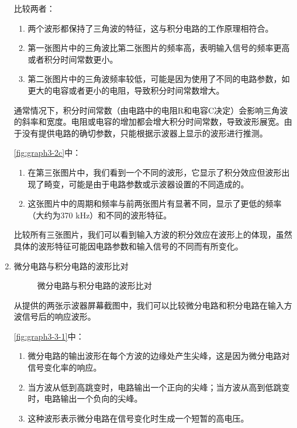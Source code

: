 \documentclass[dvipsnames, svgnames,a4paper,11pt]{article}
\begin{document}
\begin{enumerate}
		比较两者：
		\begin{enumerate}
			\item 两个波形都保持了三角波的特征，这与积分电路的工作原理相符合。
			\item 第一张图片中的三角波比第二张图片的频率高，表明输入信号的频率更高或者积分时间常数更小。
			\item 第二张图片中的三角波频率较低，可能是因为使用了不同的电路参数，如更大的电容或者更小的电阻，导致积分时间常数增大。
		\end{enumerate}

		
		通常情况下，积分时间常数（由电路中的电阻R和电容C决定）会影响三角波的斜率和宽度。电阻或电容的增加都会增大积分时间常数，导致波形展宽。由于没有提供电路的确切参数，只能根据示波器上显示的波形进行推测。
		
		\cref{fig:graph3-2c}中：
		\begin{enumerate}
			\item 在第三张图片中，我们看到一个不同的波形，它显示了积分效应但波形出现了畸变，可能是由于电路参数或示波器设置的不同造成的。
			\item 这张图片中的周期和频率与前两张图片有显著不同，显示了更低的频率（大约为370 kHz）和不同的波形特征。
		\end{enumerate}

		
		比较所有三张图片，我们可以看到输入方波的积分效应在波形上的体现，虽然具体的波形特征可能因电路参数和输入信号的不同而有所变化。
		
		\item 微分电路与积分电路的波形比对
		

		\begin{figure}[htbp]
			\centering
			\quad
			\quad
			\caption{微分电路与积分电路的波形比对}
			\label{fig:graph3-3}
		\end{figure}
		
		从提供的两张示波器屏幕截图中，我们可以比较微分电路和积分电路在输入方波信号后的响应波形。
		
		\cref{fig:graph3-3-1}中：
		\begin{enumerate}
			\item 微分电路的输出波形在每个方波的边缘处产生尖峰，这是因为微分电路对信号变化率的响应。
			\item 当方波从低到高跳变时，电路输出一个正向的尖峰；当方波从高到低跳变时，电路输出一个负向的尖峰。
			\item 这种波形表示微分电路在信号变化时生成一个短暂的高电压。
		\end{enumerate}


\end{enumerate}
\end{document}
